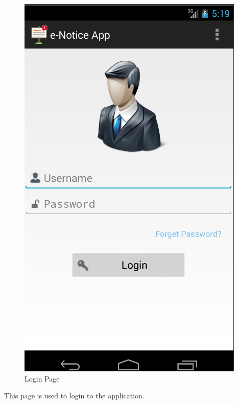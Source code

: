 \begin{figure}[H]
\centering \includegraphics[scale=0.7]{image/login.png}
\caption{Login Page}
\end{figure}
This page is used to login to the application.

